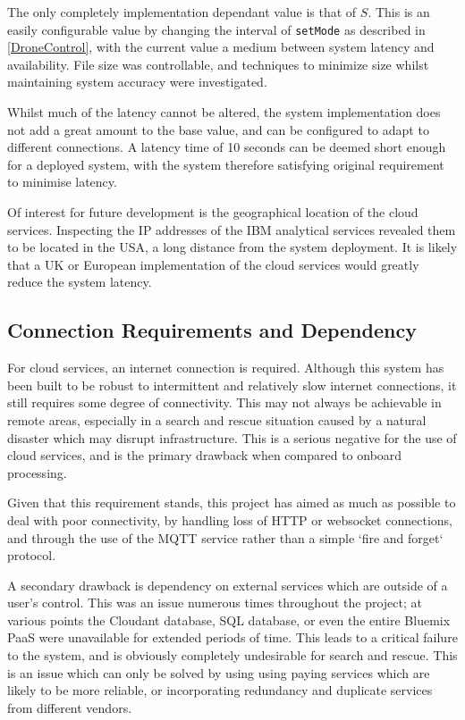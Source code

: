 \documentclass{article}
\begin{document}
The only completely implementation dependant value is that of $S$. This is an easily configurable value by changing the interval of \texttt{setMode} as described in \ref{DroneControl}, with the current value a medium between system latency and availability. File size was controllable, and techniques to minimize size whilst maintaining system accuracy were investigated. 

Whilst much of the latency cannot be altered, the system implementation does not add a great amount to the base value, and can be configured to adapt to different connections. A latency time of 10 seconds can be deemed short enough for a deployed system, with the system therefore satisfying original requirement to minimise latency. 

Of interest for future development is the geographical location of the cloud services. Inspecting the IP addresses of the IBM analytical services revealed them to be located in the USA, a long distance from the system deployment. It is likely that a UK or European implementation of the cloud services would greatly reduce the system latency.


\subsection{Connection Requirements and Dependency}
For cloud services, an internet connection is required. Although this system has been built to be robust to intermittent and relatively slow internet connections, it still requires some degree of connectivity. This may not always be achievable in remote areas, especially in a search and rescue situation caused by a natural disaster which may disrupt infrastructure. This is a serious negative for the use of cloud services, and is the primary drawback when compared to onboard processing. 

Given that this requirement stands, this project has aimed as much as possible to deal with poor connectivity, by handling loss of HTTP or websocket connections, and through the use of the MQTT service rather than a simple `fire and forget` protocol. 

A secondary drawback is dependency on external services which are outside of a user's control. This was an issue numerous times throughout the project; at various points the Cloudant database, SQL database, or even the entire Bluemix PaaS were unavailable for extended periods of time. This leads to a critical failure to the system, and is obviously completely undesirable for search and rescue. This is an issue which can only be solved by using using paying services which are likely to be more reliable, or incorporating redundancy and duplicate services from different vendors.  
\end{document}
